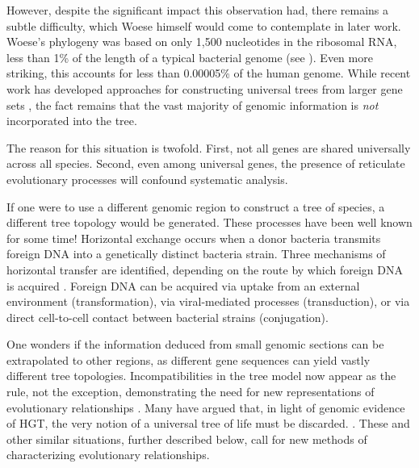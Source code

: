However, despite the significant impact this observation had, there remains a subtle difficulty, which Woese himself would come to contemplate in later work.
Woese's phylogeny was based on only 1,500 nucleotides in the ribosomal RNA, less than 1\% of the length of a typical bacterial genome (see \cite{Dagan:2006up}).
Even more striking, this accounts for less than 0.00005\% of the human genome.
While recent work has developed approaches for constructing universal trees from larger gene sets \cite{Ciccarelli:2006gw}, the fact remains that the vast majority of genomic information is \emph{not} incorporated into the tree.

The reason for this situation is twofold.
First, not all genes are shared universally across all species.
Second, even among universal genes, the presence of reticulate evolutionary processes will confound systematic analysis.

If one were to use a different genomic region to construct a tree of species, a different tree topology would be generated.
These processes have been well known for some time!
Horizontal exchange occurs when a donor bacteria transmits foreign DNA into a genetically distinct bacteria strain.
Three mechanisms of horizontal transfer are identified, depending on the route by which foreign DNA is acquired \cite{Ochman:2000dr}.
Foreign DNA can be acquired via uptake from an external environment (transformation), via viral-mediated processes (transduction), or via direct cell-to-cell contact between bacterial strains (conjugation).


One wonders if the information deduced from small genomic sections can be extrapolated to other regions, as different gene sequences can yield vastly different tree topologies.
Incompatibilities in the tree model now appear as the rule, not the exception, demonstrating the need for new representations of evolutionary relationships \autocite{Doolittle:1999,Doolittle:2006}.
Many have argued that, in light of genomic evidence of HGT, the very notion of a universal tree of life must be discarded. .
These and other similar situations, further described below, call for new methods of characterizing evolutionary relationships.

